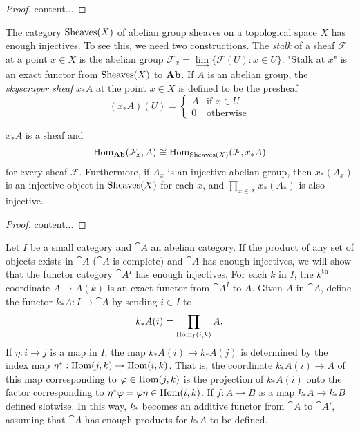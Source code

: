 \begin{proof}
	content...
\end{proof}

\begin{example}
	The category $\operatorname{Sheaves}(X)$ of abelian group sheaves on a topological space $X$ has enough injectives.
	To see this, we need two constructions.
	The \textit{stalk} of a sheaf $\mathcal{F}$ at a point $x\in X$ is the abelian group $\mathcal{F}_x = \underset{\longrightarrow}{\lim}\{\mathcal{F}(U):x\in U\}$.
	"Stalk at $x$" is an exact functor from $\operatorname{Sheaves}(X)$ to $\operatorname{\textbf{Ab}}$.
	If $A$ is an abelian group, the \textit{skyscraper sheaf} $x_*A$ at the point $x\in X$ is defined to be the presheaf
	$$(x_*A)(U)=\left\{\begin{array}{ll}A & \text{if }x\in U \\ 0 & \text{otherwise}\end{array}\right.$$
\end{example}

\begin{exercise}
	$x_*A$ is a sheaf and 
	$$\operatorname{Hom}_{\operatorname{\textbf{Ab}}}(\mathcal{F}_x,A) \cong \operatorname{Hom}_{\operatorname{Sheaves}(X)}(\mathcal{F},x_*A)$$
	for every sheaf $\mathcal{F}$.
	Furthermore, if $A_x$ is an injective abelian group, then $x_*(A_x)$ is an injective object in $\operatorname{Sheaves}(X)$ for each $x$, and $\prod_{x\in X} x_*(A_*)$ is also injective.
\end{exercise}

\begin{proof}
	content...
\end{proof}

\begin{example}
	Let $I$ be a small category and $\cat{A}$ an abelian category.
	If the product of any set of objects exists in $\cat{A}$ ($\cat{A}$ is complete) and $\cat{A}$ has enough injectives, we will show that the functor category $\cat{A}^I$ has enough injectives.
	For each $k$ in $I$, the $k^\text{th}$ coordinate $A\mapsto A(k)$ is an exact functor from $\cat{A}^I$ to $A$. Given $A$ in $\cat{A}$, define the functor $k_*A:I\rightarrow\cat{A}$ by sending $i\in I$ to
	$$k_*A(i)=\prod_{\operatorname{Hom}_{I}(i,k)}A.$$
	If $\eta:i\rightarrow j$ is a map in $I$, the map $k_*A(i)\rightarrow k_*A(j)$ is determined by the index map $\eta^*:\operatorname{Hom}(j,k)\rightarrow \operatorname{Hom}(i,k)$.
	That is, the coordinate $k_*A(i)\rightarrow A$ of this map corresponding to $\varphi\in\operatorname{Hom}(j,k)$ is the projection of $k_*A(i)$ onto the factor corresponding to $\eta^*\varphi=\varphi\eta\in\operatorname{Hom}(i,k)$.
	If $f:A\rightarrow B$ is a map $k_*A\rightarrow k_*B$ defined slotwise.
	In this way, $k_*$ becomes an additive functor from $\cat{A}$ to $\cat{A'}$, assuming that $\cat{A}$ has enough products for $k_*A$ to be defined.
\end{example}

